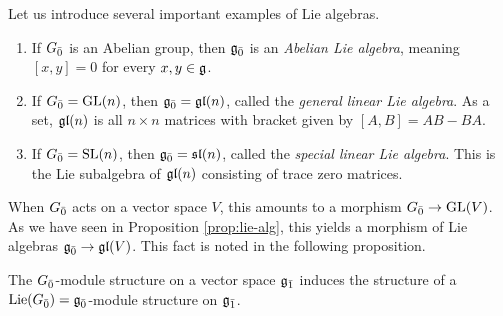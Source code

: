 Let us introduce several important examples of Lie algebras. 

\begin{example}
  \begin{enumerate}
  \item If ${G}_{\bar{0}}$ is an Abelian group, then ${\mathfrak{g}}_{\bar{0}}$ is an \emph{Abelian Lie algebra}, meaning $[x,y] = 0$ for every $x,y \in \mathfrak{g}$.
  \item If ${G}_{\bar{0}} = \operatorname{GL}(n)$, then ${\mathfrak{g}}_{\bar{0}} = \mathfrak{gl}(n)$, called the \emph{general linear Lie algebra}. As a set, $\mathfrak{gl}(n)$ is all $n \times n$ matrices with bracket given by $[A,B] = AB - BA$.
  \item If ${G}_{\bar{0}} = \operatorname{SL}(n)$, then ${\mathfrak{g}}_{\bar{0}} = \mathfrak{sl}(n)$, called the \emph{special linear Lie algebra}. This is the Lie subalgebra of $\mathfrak{gl}(n)$ consisting of trace zero matrices.
  \end{enumerate}
\end{example}

When ${G}_{\bar{0}}$ acts on a vector space $V$, this amounts to a morphism ${G}_{\bar{0}} \to \operatorname{GL}(V)$. As we have seen in Proposition \ref{prop:lie-alg}, this yields a morphism of Lie algebras ${\mathfrak{g}}_{\bar{0}} \to \mathfrak{gl}(V)$. This fact is noted in the following proposition.

\begin{proposition}
  The ${G}_{\bar{0}}$-module structure on a vector space ${\mathfrak{g}}_{\bar{1}}$ induces the structure of a $\operatorname{Lie}({G}_{\bar{0}}) = {\mathfrak{g}}_{\bar{0}}$-module structure on ${\mathfrak{g}}_{\bar{1}}$.
\end{proposition}

